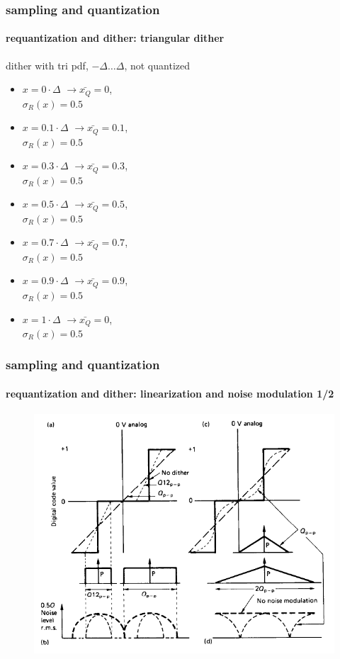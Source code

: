 	\begin{frame}\frametitle{sampling and quantization}\framesubtitle{requantization and dither: triangular dither}
        \vspace{-5mm}
        dither with tri pdf, $-{\Delta}\ldots {\Delta}$, not quantized
        \begin{itemize}
            \item   $x = 0 \cdot \Delta$ \pause $\rightarrow \bar{x_Q} =0$,\\ $\sigma_R(x) = 0.5$
            \pause
            \item   $x = 0.1 \cdot \Delta$ \pause $\rightarrow \bar{x_Q} = 0.1 $,\\ $\sigma_R(x) = 0.5$ 
            \pause
            \item   $x = 0.3 \cdot \Delta$ \pause $\rightarrow \bar{x_Q} = 0.3 $,\\ $\sigma_R(x) = 0.5$ 
            \pause
            \item   $x = 0.5 \cdot \Delta$ \pause $\rightarrow \bar{x_Q} = 0.5 $,\\ $\sigma_R(x) = 0.5$ 
            \pause
            \item   $x = 0.7 \cdot \Delta$ \pause $\rightarrow \bar{x_Q} = 0.7 $,\\ $\sigma_R(x) = 0.5$ 
            \pause
            \item   $x = 0.9 \cdot \Delta$ \pause $\rightarrow \bar{x_Q} = 0.9 $,\\ $\sigma_R(x) = 0.5$ 
            \pause
            \item   $x = 1 \cdot \Delta$ \pause $\rightarrow \bar{x_Q} =0$,\\ $\sigma_R(x) = 0.5$
        \end{itemize}
	\end{frame}	
	\begin{frame}\frametitle{sampling and quantization}\framesubtitle{requantization and dither: linearization and noise modulation 1/2}
	    \begin{figure}
			\begin{center}
				\includegraphics[scale=0.5]{Graph/dither_and_noisemodulation}
			\end{center}
		\end{figure}
	\end{frame}	
